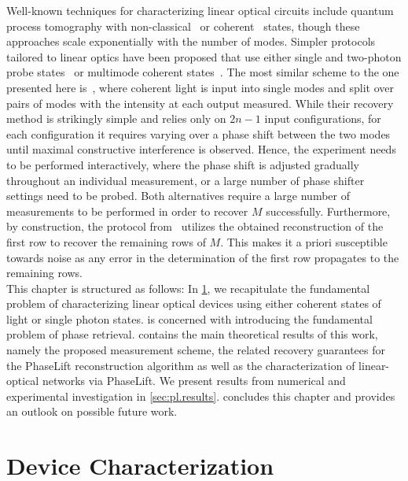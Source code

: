 Well-known techniques for characterizing linear optical circuits include quantum process tomography with non-classical~\cite{Brien_2004_Quantum} or coherent~\cite{Keshari_2011_Quantum} states, though these approaches scale exponentially with the number of modes.
Simpler protocols tailored to linear optics have been proposed that use either single and two-photon probe states~\cite{Laing_2012_SuperStable,Dhand_2016_Accurate,Spagnolo_2017_Learning} or multimode coherent states~\cite{Keshari_2013_Direct,Tillmann_2016_On}.
The most similar scheme to the one presented here is~\cite{Keshari_2013_Direct}, where coherent light is input into single modes and split over pairs of modes with the intensity at each output measured.
While their recovery method is strikingly simple and relies only on $2n-1$ input configurations, for each configuration it requires varying over a phase shift between the two modes until maximal constructive interference is observed.
Hence, the experiment needs to be performed interactively, where the phase shift is adjusted gradually throughout an individual measurement, or a large number of phase shifter settings need to be probed.
Both alternatives require a large number of measurements to be performed in order to recover $M$ successfully.
Furthermore, by construction, the protocol from~\cite{Keshari_2013_Direct} utilizes the obtained reconstruction of the first row to recover the remaining rows of $M$.
This makes it a priori susceptible towards noise as any error in the determination of the first row propagates to the remaining rows.\\



This chapter is structured as follows:
In \cref{sec:pl.optics}, we recapitulate the fundamental problem of characterizing linear optical devices using either coherent states of light or single photon states.
 is concerned with introducing the fundamental problem of phase retrieval.
 contains the main theoretical results of this work, namely the proposed measurement scheme, the related recovery guarantees for the PhaseLift reconstruction algorithm as well as the characterization of linear-optical networks via PhaseLift.
We present results from numerical and experimental investigation in \cref{sec:pl.results}.
 concludes this chapter and provides an outlook on possible future work.


\section{Device Characterization}%
\label{sec:pl.optics}

